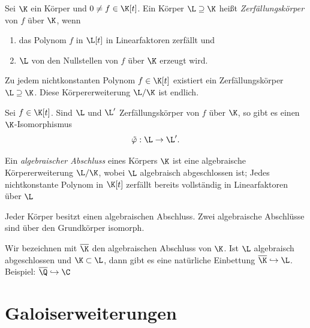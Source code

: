 \documentclass[11pt, a4paper]{article}
\begin{document}
\begin{definition}[Zerfällungskörper] \Theorem
    Sei $\K$ ein Körper und $0 \neq f \in \K[t]$. Ein Körper $\L \supseteq \K$ heißt \emph{Zerfällungskörper} von $f$ über $\K$, wenn
    \begin{enumerate}[label=(\roman*)]
        \item das Polynom $f$ in $\L[t]$ in Linearfaktoren zerfällt und
        \item $\L$ von den Nullstellen von $f$ über $\K$ erzeugt wird.
    \end{enumerate}
\end{definition}


\begin{theorem} \Theorem
    Zu jedem nichtkonstanten Polynom $f \in \K[t]$ existiert ein Zerfällungskörper $\L \supseteq\K$. Diese Körpererweiterung $\L/\K$ ist endlich.
\end{theorem}

\begin{theorem}
    Sei $f \in \K[t]$. Sind $\L$ und $\L'$ Zerfällungskörper von $f$ über $\K$, so gibt es einen $\K$-Isomorphismus
    $$\tilde\varphi: \L \to \L'.$$
\end{theorem}

\begin{definition} \Theorem
    Ein \emph{algebraischer Abschluss} eines Körpers $\K$ ist eine algebraische Körpererweiterung $\L/\K$, wobei $\L$ algebraisch abgeschlossen ist; Jedes nichtkonstante Polynom in $\K[t]$ zerfällt bereits vollständig in Linearfaktoren über $\L$
\end{definition}

\begin{theorem}
    Jeder Körper besitzt einen algebraischen Abschluss. Zwei algebraische Abschlüsse sind über den Grundkörper isomorph.
\end{theorem}


\begin{note}
    Wir bezeichnen mit $\overline\K$ den algebraischen Abschluss von $\K$. Ist $\L$ algebraisch abgeschlossen und $\K\subset \L$, dann gibt es eine natürliche Einbettung $\overline{\K}\hookrightarrow\L$. Beispiel: $\overline \Q \hookrightarrow \C$
\end{note}

\newpage
\section{Galoiserweiterungen}
\end{document}
